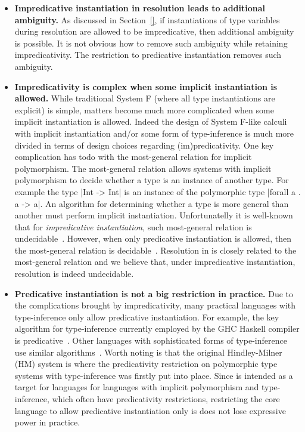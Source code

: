 \begin{itemize}

\item {\bf Impredicative instantiation in resolution leads to additional
    ambiguity.} As discussed in Section~\ref{}, if instantiations of
  type variables during resolution are allowed to be impredicative,
  then additional ambiguity is possible. It is not obvious how to
  remove such ambiguity while retaining impredicativity. The
  restriction to predicative instantiation removes such ambiguity.

\item {\bf Impredicativity is complex when some implicit instantiation
  is allowed.} While traditional System F (where all type
instantiations are explicit) is simple, matters become much more
complicated when some implicit instantiation is allowed. Indeed the
design of System F-like calculi with implicit instantiation and/or
some form of type-inference is much more divided in terms of design
choices regarding (im)predicativity. One key complication has todo
with the most-general relation for implicit
polymorphism. The most-general relation allows systems with implicit 
polymorphism to decide whether a type is an instance of another type. 
For example the type |Int -> Int| is an instance of the polymorphic 
type |forall a . a -> a|. An algorithm for determining whether a type
is more general than another must perform implicit instantiation. 
Unfortunatelly it is well-known that for \emph{impredicative
  instantiation}, such most-general relation is undecidable~\cite{}. 
However, when only predicative instantiation is allowed, then 
the most-general relation is decidable~\cite{}. 
Resolution in \name is closely related to the most-general relation 
and we believe that, under impredicative instantiation, resolution is
indeed undecidable.

\item {\bf Predicative instantiation is not a big restriction in
    practice.} 
Due to the complications brought by impredicativity, many practical 
languages with type-inference only allow predicative instantiation.
For example, the key algorithm for type-inference currently employed 
by the GHC Haskell compiler is predicative~\cite{}. Other languages
with sophisticated forms of type-inference use similar
algorithms~\cite{}. Worth noting is that the original Hindley-Milner (HM)
system is where the predicativity restriction on polymorphic type
systems with type-inference was firstly put into place. 
Since \name is intended as a target for languages for languages with 
implicit polymorphism and type-inference, which often have
predicativity restrictions, restricting the core language to allow
predicative instantiation only is does not lose expressive power in practice.

\end{itemize}

